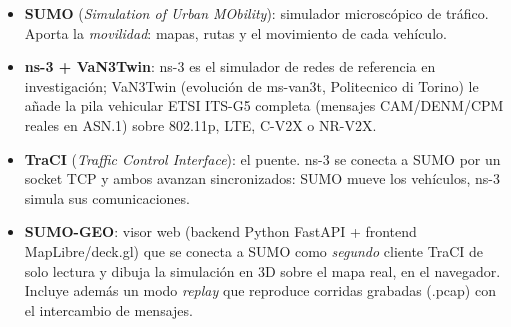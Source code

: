\documentclass[11pt,a4paper]{article}
\begin{document}
\begin{itemize}[leftmargin=1.6em, itemsep=2pt]
  \item \textbf{SUMO} (\emph{Simulation of Urban MObility}): simulador
        microscópico de tráfico. Aporta la \emph{movilidad}: mapas, rutas y
        el movimiento de cada vehículo.
  \item \textbf{ns-3 + VaN3Twin}: ns-3 es el simulador de redes de referencia
        en investigación; VaN3Twin (evolución de ms-van3t, Politecnico di
        Torino) le añade la pila vehicular ETSI ITS-G5 completa (mensajes
        CAM/DENM/CPM reales en ASN.1) sobre 802.11p, LTE, C-V2X o NR-V2X.
  \item \textbf{TraCI} (\emph{Traffic Control Interface}): el puente. ns-3 se
        conecta a SUMO por un socket TCP y ambos avanzan sincronizados: SUMO
        mueve los vehículos, ns-3 simula sus comunicaciones.
  \item \textbf{SUMO-GEO}: visor web (backend Python FastAPI + frontend
        MapLibre/deck.gl) que se conecta a SUMO como \emph{segundo} cliente
        TraCI de solo lectura y dibuja la simulación en 3D sobre el mapa
        real, en el navegador. Incluye además un modo \emph{replay} que
        reproduce corridas grabadas (.pcap) con el intercambio de mensajes.
\end{itemize}
\end{document}
